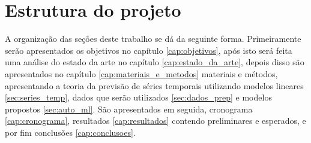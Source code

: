 \section{Estrutura do projeto}

A organização das seções deste trabalho se dá da seguinte forma. Primeiramente serão apresentados os objetivos no capítulo \ref{cap:objetivos}, após isto será feita uma análise do estado da arte no capítulo \ref{cap:estado_da_arte}, depois disso são apresentados no capítulo \ref{cap:materiais_e_metodos} materiais e métodos, apresentando a teoria da previsão de séries temporais utilizando modelos lineares \ref{sec:series_temp}, dados que serão utilizados \ref{sec:dados_prep} e modelos propostos \ref{sec:auto_ml}. São apresentados em seguida, cronograma \ref{cap:cronograma}, resultados \ref{cap:resultados} contendo preliminares e esperados, e por fim conclusões \ref{cap:conclusoes}.